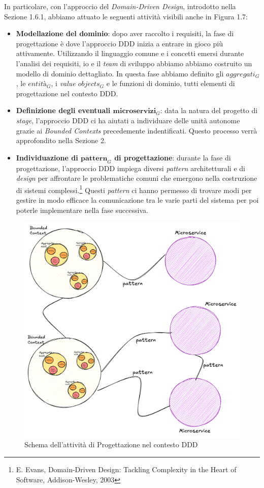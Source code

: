         \vspace{0.2 em}
        \noindent In particolare, con l'approccio del \textit{Domain-Driven Design}, introdotto nella Sezione 1.6.1, abbiamo attuato le seguenti attività visibili anche in Figura 1.7:
        \begin{itemize}
            \item \textbf{Modellazione del dominio}: dopo aver raccolto i requisiti, la fase di progettazione è dove l'approccio DDD inizia a entrare in gioco più attivamente. Utilizzando il linguaggio comune e i concetti emersi durante l'analisi dei requisiti, io e il \textit{team} di sviluppo abbiamo abbiamo costruito un modello di dominio dettagliato. In questa fase abbiamo definito gli $aggregati_G$, le $entità_G$, i \textit{value $objects_G$} e le funzioni di dominio, tutti elementi di progettazione nel contesto DDD. 
            \item \textbf{Definizione degli eventuali $\textbf{microservizi}_G$}: data la natura del progetto di \textit{stage}, l'approccio DDD ci ha aiutati a individuare delle unità autonome grazie ai \textit{Bounded Contexts} precedemente indentificati. Questo processo verrà approfondito nella Sezione 2.
            \item \textbf{Individuazione di $\textbf{pattern}_G$ di progettazione}: durante la fase di progettazione, l’approccio DDD impiega diversi \textit{pattern} architetturali e di \textit{design} per affrontare le problematiche comuni che emergono nella costruzione di sistemi complessi.\footnote{E. Evans, Domain-Driven Design: Tackling Complexity in the Heart of Software, Addison-Wesley, 2003} Questi \textit{pattern} ci hanno permesso di trovare modi per gestire in modo efficace la comunicazione tra le varie parti del sistema per poi poterle implementare nella fase successiva.
        \end{itemize}

        \begin{figure}
            \centering
            \includegraphics[width=0.5\linewidth]{BCS-Tessi/images/Progettazione_DDD.png}
            \caption{Schema dell'attività di Progettazione nel contesto DDD}
            \label{fig:progettazione-DDD}
        \end{figure}
        
